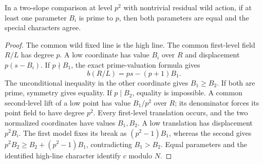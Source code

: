 \begin{lemma}\label{lem:prime-residual-comparison}
In a two-slope comparison at level $p^2$ with nontrivial residual wild action, if at least one parameter $B_i$ is prime to $p$, then both parameters are equal and the special characters agree.
\end{lemma}
\begin{proof}
The common wild fixed line is the high line. The common first-level field $R/L$ has degree $p$. A low coordinate has value $B_i$ over $R$ and displacement $p(s-B_i)$. If $p\nmid B_1$, the exact prime-valuation formula gives
\[
                   b(R/L)=ps-(p+1)B_1.
\]
The unconditional inequality in the other coordinate gives $B_1\ge B_2$. If both are prime, symmetry gives equality. If $p\mid B_2$, equality is impossible. A common second-level lift of a low point has value $B_1/p^2$ over $R$; its denominator forces its point field to have degree $p^2$. Every first-level translation occurs, and the two normalized coordinates have values $B_1,B_2$. A low translation has displacement $p^2B_i$. The first model fixes its break as $(p^2-1)B_1$, whereas the second gives $p^2B_2\ge B_2+(p^2-1)B_1$, contradicting $B_1>B_2$. Equal parameters and the identified high-line character identify $c$ modulo $N$.
\end{proof}
